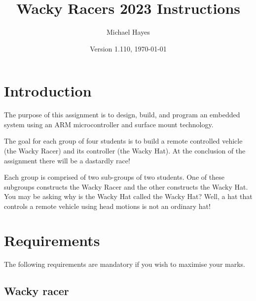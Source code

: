 \documentclass[11pt, a4paper]{article}
\title{Wacky Racers 2023 Instructions}
\author{Michael Hayes}
\date{Version 1.110, \today}
\begin{document}
\maketitle

\section{Introduction}

The purpose of this assignment is to design, build, and program an
embedded system using an ARM microcontroller and surface mount
technology.

The goal for each group of four students is to build a remote
controlled vehicle (the Wacky Racer) and its controller (the Wacky
Hat).  At the conclusion of the assignment there will be a dastardly race!

Each group is comprised of two sub-groups of two students.  One of
these subgroups constructs the Wacky Racer and the other constructs
the Wacky Hat.  You may be asking why is the Wacky Hat called the
Wacky Hat?  Well, a hat that controls a remote vehicle using head
motions is not an ordinary hat!


\section{Requirements}

The following requirements are mandatory if you wish to maximise your
marks.


\subsection{Wacky racer}
\end{document}
